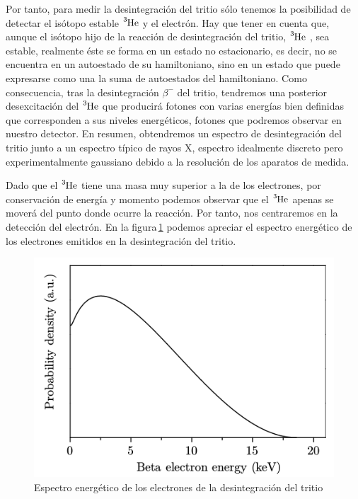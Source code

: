 Por tanto, para medir la desintegración del tritio sólo tenemos la posibilidad de detectar el isótopo estable $\ce{^3He}$  y el electrón. Hay que tener en cuenta que, aunque el isótopo hijo de la reacción de desintegración del tritio, $\ce{^3He}$ , sea estable, realmente éste se forma en un estado no estacionario, es decir, no se encuentra en un autoestado de su hamiltoniano, sino en un estado que puede expresarse como una la suma de autoestados del hamiltoniano. Como consecuencia, tras la desintegración $\beta^-$ del tritio, tendremos una posterior desexcitación del $\ce{^3He}$ que producirá fotones con varias energías bien definidas que corresponden a sus niveles energéticos, fotones que podremos observar en nuestro detector. En resumen, obtendremos un espectro de desintegración del tritio junto a un espectro típico de rayos X, espectro idealmente discreto pero experimentalmente gaussiano debido a la resolución  de los aparatos de medida.

Dado que el $\ce{^3He}$  tiene una masa muy superior a la de los electrones, por conservación de energía y momento podemos observar que el $\ce{^3He}$  apenas se moverá del punto donde ocurre la reacción. Por tanto, nos centraremos en la detección del electrón. En la figura\,\ref{fig:Espectrotritio} podemos apreciar el espectro energético de los electrones emitidos en la desintegración del tritio.

\begin{figure}[hbtp]
\includegraphics[scale=0.6]{Espectro.png}
\centering
\caption{Espectro energético de los electrones de la desintegración del tritio ~\cite{TesisTritio}\label{fig:Espectrotritio}}
\end{figure}

